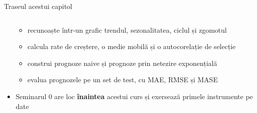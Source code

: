 \begin{frame}{Traseul acestui capitol}
\begin{columns}[T]
\begin{column}{0.50\textwidth}
\begin{itemize}
\begin{itemize}
        \item recunoaște într-un grafic trendul, sezonalitatea, ciclul și zgomotul
        \item calcula rate de creștere, o medie mobilă și o autocorelație de selecție
        \item construi prognoze naive și prognoze prin netezire exponențială
        \item evalua prognozele pe un set de test, cu MAE, RMSE și MASE
    \end{itemize}
    \item Seminarul 0 are loc \textbf{înaintea} acestui curs și exersează primele instrumente pe date
\end{itemize}
\end{column}
\end{columns}
\end{frame}


